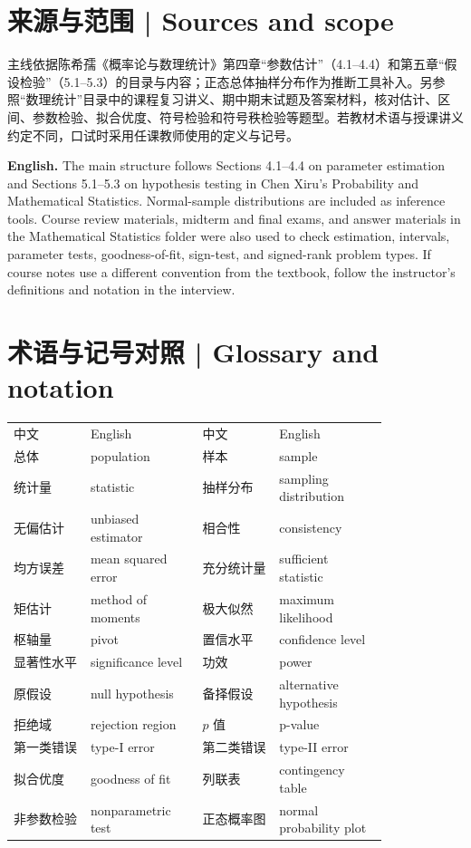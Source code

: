 \documentclass[UTF8,11pt,a4paper]{ctexart}
\newcommand{\EN}[1]{\par\noindent\textbf{English.} #1\par}
\begin{document}
\section*{来源与范围 | Sources and scope}
主线依据陈希孺《概率论与数理统计》第四章“参数估计”（4.1--4.4）和第五章“假设检验”（5.1--5.3）的目录与内容；正态总体抽样分布作为推断工具补入。另参照“数理统计”目录中的课程复习讲义、期中期末试题及答案材料，核对估计、区间、参数检验、拟合优度、符号检验和符号秩检验等题型。若教材术语与授课讲义约定不同，口试时采用任课教师使用的定义与记号。
\EN{The main structure follows Sections 4.1--4.4 on parameter estimation and Sections 5.1--5.3 on hypothesis testing in Chen Xiru's Probability and Mathematical Statistics. Normal-sample distributions are included as inference tools. Course review materials, midterm and final exams, and answer materials in the Mathematical Statistics folder were also used to check estimation, intervals, parameter tests, goodness-of-fit, sign-test, and signed-rank problem types. If course notes use a different convention from the textbook, follow the instructor's definitions and notation in the interview.}
\section*{术语与记号对照 | Glossary and notation}
\begin{center}
\small
\begin{tabular}{p{0.17\linewidth}p{0.24\linewidth}p{0.17\linewidth}p{0.24\linewidth}}
中文 & English & 中文 & English\\
总体 & population & 样本 & sample\\
统计量 & statistic & 抽样分布 & sampling distribution\\
无偏估计 & unbiased estimator & 相合性 & consistency\\
均方误差 & mean squared error & 充分统计量 & sufficient statistic\\
矩估计 & method of moments & 极大似然 & maximum likelihood\\
枢轴量 & pivot & 置信水平 & confidence level\\
显著性水平 & significance level & 功效 & power\\
原假设 & null hypothesis & 备择假设 & alternative hypothesis\\
拒绝域 & rejection region & $p$ 值 & p-value\\
第一类错误 & type-I error & 第二类错误 & type-II error\\
拟合优度 & goodness of fit & 列联表 & contingency table\\
非参数检验 & nonparametric test & 正态概率图 & normal probability plot\\
\end{tabular}
\end{center}
\end{document}
